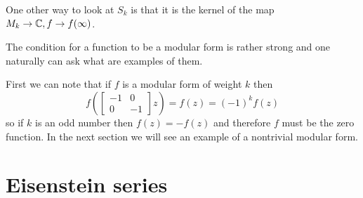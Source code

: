 
\mb 

One other way to look at $S_k$ is that it is the kernel of the map $M_k\rightarrow{}\mathbb C, f\rightarrow{} f(\infty)$.

\mb 

The condition for a function to be a modular form is rather strong and one naturally 
can ask what are examples of them.

First we can note that if $f$ is a modular form of weight $k$ then 
\[f\left(\begin{bmatrix}
    -1 & 0 \\
    0 & -1
\end{bmatrix}z\right) = f(z) = (-1)^kf(z)\]
so if $k$ is an odd number then $f(z) = -f(z)$ and therefore $f$ must be the zero function. In the next section
we will see an example of a nontrivial modular form.

\section{Eisenstein series}

